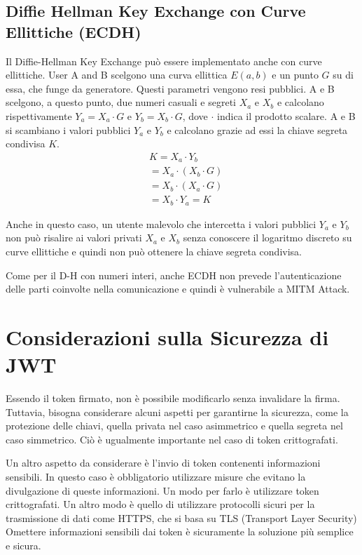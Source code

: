 \documentclass{article}
\begin{document}
\subsection{Diffie Hellman Key Exchange con Curve Ellittiche (ECDH)}
Il Diffie-Hellman Key Exchange può essere implementato anche con curve ellittiche.
User A and B scelgono una curva ellittica $E(a,b)$ e un punto $G$ su di essa, che funge da generatore. Questi parametri vengono resi pubblici.
A e B scelgono, a questo punto, due numeri casuali e segreti $X_a$ e $X_b$ e calcolano rispettivamente $Y_a = X_a \cdot G$ e $Y_b = X_b \cdot G$, dove $\cdot$ indica il prodotto scalare.
A e B si scambiano i valori pubblici $Y_a$ e $Y_b$ e calcolano grazie ad essi la chiave segreta condivisa $K$.
\begin{equation}
	\begin{aligned}
		&K = X_a \cdot Y_b\\
		&= X_a \cdot (X_b \cdot G)\\
		&= X_b \cdot (X_a \cdot G)\\
		&= X_b \cdot Y_a = K
	\end{aligned}
\end{equation}

Anche in questo caso, un utente malevolo che intercetta i valori pubblici $Y_a$ e $Y_b$ non può risalire ai valori privati $X_a$ e $X_b$ senza conoscere il logaritmo discreto su curve ellittiche e quindi non può ottenere la chiave segreta condivisa.

Come per il D-H con numeri interi, anche ECDH non prevede l'autenticazione delle parti coinvolte nella comunicazione e quindi è vulnerabile a MITM Attack.

\section{Considerazioni sulla Sicurezza di JWT}
Essendo il token firmato, non è possibile modificarlo senza invalidare la firma.
Tuttavia, bisogna considerare alcuni aspetti per garantirne la sicurezza, come la protezione delle chiavi, quella privata nel caso asimmetrico e quella segreta nel caso simmetrico.
Ciò è ugualmente importante nel caso di token crittografati.

Un altro aspetto da considerare è l'invio di token contenenti informazioni sensibili.
In questo caso è obbligatorio utilizzare misure che evitano la divulgazione di queste informazioni.
Un modo per farlo è utilizzare token crittografati.
Un altro modo è quello di utilizzare protocolli sicuri per la trasmissione di dati come HTTPS, che si basa su TLS (Transport Layer Security)
Omettere informazioni sensibili dai token è sicuramente la soluzione più semplice e sicura.
\end{document}

